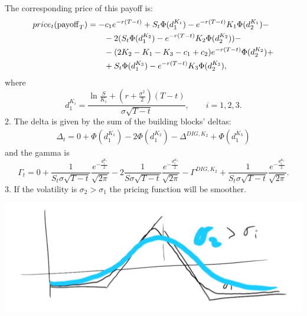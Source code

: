 \begin{example}{}{}{}
\begin{itemize}
    \end{itemize}
    The corresponding price of this payoff is:
    \begin{align} %
        \notag price_t(\pay_T) &= -c_1e^{-r(T-t)} + S_t\Phi(d_1^{K_1}) - e^{-r(T-t)}K_1\Phi(d_2^{K_1}) - \\
        &\qquad
        \notag - 2(S_t\Phi(d_1^{K_2})-e^{-r(T-t)}K_2\Phi(d_2^{K_2})) - \\
        &\qquad
        \notag - (2K_2-K_1-K_3-c_1+c_2)e^{-r(T-t)}\Phi(d_2^{K_2}) + \\
        &\qquad
        + S_t\Phi(d_1^{K_3}) - e^{-r(T-t)}K_3\Phi(d_2^{K_3}),
    \end{align}
    where
    \begin{equation}
        d_1^{K_i} = \dfrac{\ln\frac{S}{K_i}+\left(r+\frac{\sigma^2}{2}\right)(T-t)}{\sigma\sqrt{T-t}}, \qquad i = 1,2,3.
    \end{equation}
    2. The delta is given by the sum of the building blocks' deltas:
    \begin{align}
        \Delta_t = 0 + \Phi(d_1^{K_1}) - 2\Phi(d_1^{K_2}) - \Delta^{DIG, K_2} + \Phi(d_1^{K_3})
    \end{align}
    and the gamma is
    \begin{equation}
        \Gamma_t = 0 + \dfrac{1}{S_t\sigma\sqrt{T-t}}\dfrac{e^{-\frac{d_1^{K_1}}{2}}}{\sqrt{2\pi}} - 2\dfrac{1}{S\sigma\sqrt{T-t}}\dfrac{e^{-\frac{d_1^{K_2}}{2}}}{\sqrt{2\pi}} - \Gamma^{DIG,K_2} + \dfrac{1}{S_t\sigma\sqrt{T-t}}\dfrac{e^{-\frac{d_1^{K_3}}{2}}}{\sqrt{2\pi}}.
    \end{equation}
    3. If the volatility is $\sigma_2>\sigma_1$ the pricing function will be smoother. %
    \begin{center}
        \includegraphics[scale=0.3]{fig/tmp/fig29.png}
    \end{center}
\end{example}

